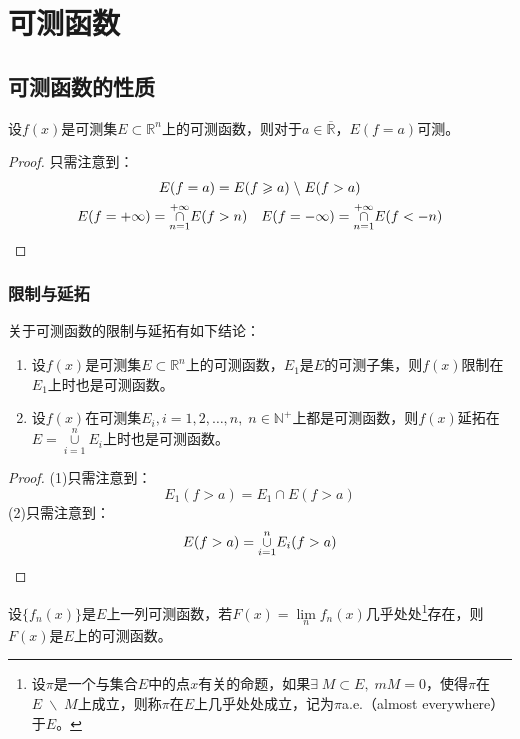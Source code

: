 \section{可测函数}


\subsection{可测函数的性质}
\begin{theorem}
	设$f(x)$是可测集$E\subset\mathbb{R}^n$上的可测函数，则对于$a\in\overline{\mathbb{R}}$，$E(f=a)$可测。
\end{theorem}
\begin{proof}
	只需注意到：
	\begin{gather*}
		E(f=a)=E(f\geqslant a)\;\backslash\;E(f>a) \\
		E(f=+\infty)=\underset{n=1}{\overset{+\infty}{\cap}}E(f>n)\quad
		E(f=-\infty)=\underset{n=1}{\overset{+\infty}{\cap}}E(f<-n)\qedhere
	\end{gather*}
\end{proof}
\subsubsection{限制与延拓}
\begin{theorem}
	关于可测函数的限制与延拓有如下结论：
	\begin{enumerate}
		\item 设$f(x)$是可测集$E\subset\mathbb{R}^n$上的可测函数，$E_1$是$E$的可测子集，则$f(x)$限制在$E_1$上时也是可测函数。
		\item 设$f(x)$在可测集$E_i,i=1,2,\dots,n,\;n\in\mathbb{N}^+$上都是可测函数，则$f(x)$延拓在$E=\underset{i=1}{\overset{n}{\cup}}E_i$上时也是可测函数。
	\end{enumerate}
\end{theorem}
\begin{proof}
	(1)只需注意到：
	\begin{equation*}
		E_1(f>a)=E_1\cap E(f>a)
	\end{equation*}
	(2)只需注意到：
	\begin{equation*}
		E(f>a)=\underset{i=1}{\overset{n}{\cup}}E_i(f>a)\qedhere
	\end{equation*}
\end{proof}

\begin{corollary}
	设$\{f_n(x)\}$是$E$上一列可测函数，若$F(x)=\lim\limits_nf_n(x)$几乎处处\footnote{设$\pi$是一个与集合$E$中的点$x$有关的命题，如果$\exists\;M\subset E,\;mM=0$，使得$\pi$在$E\;\backslash\;M$上成立，则称$\pi$在$E$上几乎处处成立，记为$\pi$a.e.（almost everywhere）于$E$。}存在，则$F(x)$是$E$上的可测函数。
\end{corollary}




